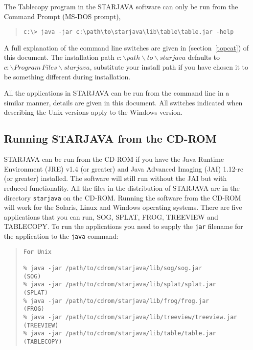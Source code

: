 \documentclass[twoside,11pt]{article}
\newcommand{\latex}[1]{#1}
\newcommand{\xlabel}[1]{}
\renewcommand{\_}{\texttt{\symbol{95}}}
\begin{document}
The Tablecopy program in the STARJAVA software can only be run from the 
Command Prompt (MS-DOS prompt),  

\begin{quote}
\begin{verbatim}
c:\> java -jar c:\path\to\starjava\lib\table\table.jar -help
\end{verbatim}
\end{quote}
 
A full explanation of the command line switches are given in \latex{(section~\ref{topcat})} of 
this document. The installation path \texttt{$c:\backslash path \backslash to \backslash starjava$} defaults to
\texttt{$c:\backslash Program \, Files \backslash starjava$}, substitute your install path if you have chosen it
to be something different during installation.

All the applications in STARJAVA can be run from the command line in a similar 
manner, details are given in this document. All switches indicated when describing
the Unix versions apply to the Windows version.

\subsection{\label{cdrom}\xlabel{cdrom}Running STARJAVA from the CD-ROM}

STARJAVA can be run from the CD-ROM if you have the Java Runtime 
Environment (JRE) v1.4 (or greater) and Java Advanced Imaging (JAI)
1.1\_2-rc (or greater) installed. The software will still run without 
the JAI but with reduced functionality. All the files in the distribution 
of STARJAVA are in the directory \texttt{starjava} on the CD-ROM.
Running the software from the CD-ROM will work for the Solaris, Linux
and Windows operating systems. There are five applications
that you can run, SOG, SPLAT, FROG, TREEVIEW and TABLECOPY. To run
the applications you need to supply the \texttt{jar} filename for
the application to the \texttt{java} command: 

\begin{quote}
\begin{verbatim}
For Unix

% java -jar /path/to/cdrom/starjava/lib/sog/sog.jar           (SOG)
% java -jar /path/to/cdrom/starjava/lib/splat/splat.jar       (SPLAT)
% java -jar /path/to/cdrom/starjava/lib/frog/frog.jar         (FROG)
% java -jar /path/to/cdrom/starjava/lib/treeview/treeview.jar (TREEVIEW)
% java -jar /path/to/cdrom/starjava/lib/table/table.jar       (TABLECOPY)
\end{verbatim}
\end{quote}
\end{document}
